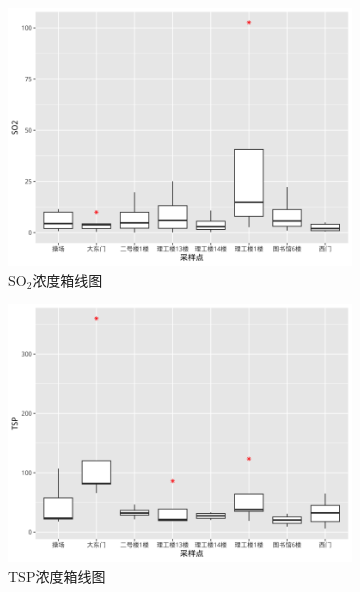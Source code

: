 \documentclass[12pt,hyperref,a4paper,UTF8]{ctexart}
\begin{document}
\begin{figure}[!htbp]
    \centering
    \begin{subfigure}[b]{0.32\textwidth}
        \includegraphics[width=\textwidth]{dataout/SO2_boxplot.png}
        \caption{SO$_2$浓度箱线图}
        \label{fig:SO2_boxplot}
    \end{subfigure}
    \hfill
    \begin{subfigure}[b]{0.32\textwidth}
        \includegraphics[width=\textwidth]{dataout/TSP_boxplot.png}
        \caption{TSP浓度箱线图}
        \label{fig:TSP_boxplot}
    \end{subfigure}
    \hfill
    \begin{subfigure}[b]{0.32\textwidth}

\end{subfigure}
\end{figure}
\end{document}
